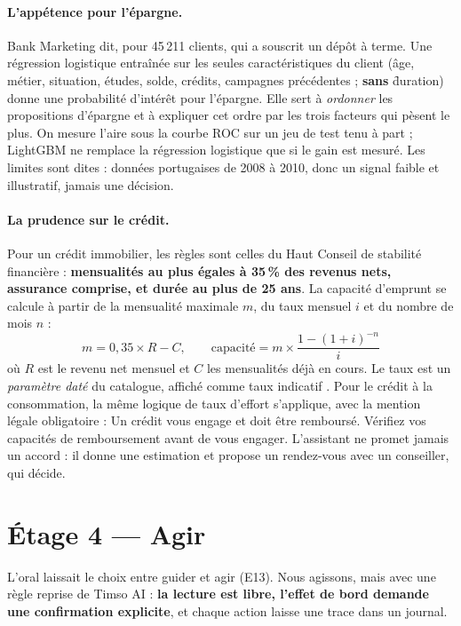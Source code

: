 \paragraph{L'appétence pour l'épargne.} Bank Marketing dit, pour 45\,211 clients, qui a souscrit un
dépôt à terme. Une régression logistique entraînée sur les seules caractéristiques du client (âge,
métier, situation, études, solde, crédits, campagnes précédentes ; \textbf{sans} \f{duration})
donne une probabilité d'intérêt pour l'épargne. Elle sert à \emph{ordonner} les propositions
d'épargne et à expliquer cet ordre par les trois facteurs qui pèsent le plus. On mesure l'aire sous
la courbe ROC sur un jeu de test tenu à part ; LightGBM ne remplace la régression logistique que si
le gain est mesuré. Les limites sont dites : données portugaises de 2008 à 2010, donc un signal
faible et illustratif, jamais une décision.

\paragraph{La prudence sur le crédit.} Pour un crédit immobilier, les règles sont celles du Haut
Conseil de stabilité financière : \textbf{mensualités au plus égales à 35\,\% des revenus nets,
assurance comprise, et durée au plus de 25 ans}. La capacité d'emprunt se calcule à partir de la
mensualité maximale $m$, du taux mensuel $i$ et du nombre de mois $n$ :
\[
  m = 0{,}35 \times R - C, \qquad
  \text{capacité} = m \times \frac{1 - (1+i)^{-n}}{i}
\]
où $R$ est le revenu net mensuel et $C$ les mensualités déjà en cours. Le taux est un
\emph{paramètre daté} du catalogue, affiché comme \og taux indicatif \fg. Pour le crédit à la
consommation, la même logique de taux d'effort s'applique, avec la mention légale obligatoire :
\og Un crédit vous engage et doit être remboursé. Vérifiez vos capacités de remboursement avant de
vous engager. \fg{} L'assistant ne promet jamais un accord : il donne une estimation et propose un
rendez-vous avec un conseiller, qui décide.

\section{Étage 4 --- Agir}

L'oral laissait le choix entre guider et agir (E13). Nous agissons, mais avec une règle reprise de
Timso AI : \textbf{la lecture est libre, l'effet de bord demande une confirmation explicite}, et
chaque action laisse une trace dans un journal.


